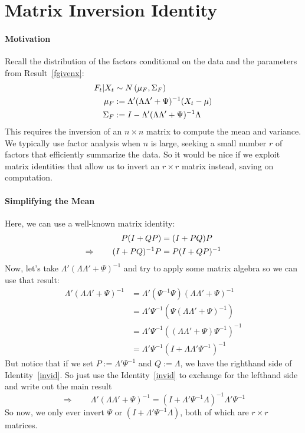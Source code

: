 \documentclass[12pt]{article}
\theoremstyle{plain}
\theoremstyle{definition}
\theoremstyle{remark}
\begin{document}
\section{Matrix Inversion Identity}
\label{sec:inv}

\paragraph{Motivation} Recall the distribution of the factors
conditional on the data and the parameters from Result~\ref{fgivenx}:
\begin{align}
  F_t|X_t &\sim N\left(\mu_F, \Sigma_F\right) \notag\\
  \mu_F &:= \Lambda'(\Lambda\Lambda'+\Psi)^{-1}(X_t-\mu) \notag\\
  \Sigma_F &:= I- \Lambda'(\Lambda\Lambda'+\Psi)^{-1}\Lambda \notag
\end{align}
This requires the inversion of an $n\times n$ matrix to compute the mean
and variance. We typically use factor analysis when $n$ is large,
seeking a small number $r$ of factors that efficiently summarize the
data. So it would be nice if we exploit matrix identities that allow us
to invert an $r\times r$ matrix instead, saving on computation.

\paragraph{Simplifying the Mean}
Here, we can use a well-known matrix identity:
\begin{align}
  P(I+QP) &= (I+PQ)P \notag\\
  \Rightarrow \qquad
  (I+PQ)^{-1}P &= P (I+QP)^{-1} \label{invid}
\end{align}
Now, let's take $\Lambda'(\Lambda \Lambda' +\Psi)^{-1}$ and try to apply
some matrix algebra so we can use that result:
\begin{align*}
    \Lambda'(\Lambda \Lambda' +\Psi)^{-1} &=
    \Lambda' \left(\Psi^{-1}\Psi\right)(\Lambda \Lambda' +\Psi)^{-1}\\
    &= \Lambda' \Psi^{-1}\left(\Psi(\Lambda \Lambda' +\Psi)^{-1}\right)\\
    &= \Lambda' \Psi^{-1}\left((\Lambda \Lambda'
      +\Psi)\Psi^{-1}\right)^{-1}\\
    &= \Lambda' \Psi^{-1}\left(I+\Lambda \Lambda'\Psi^{-1}\right)^{-1}
\end{align*}
But notice that if we set $P:=\Lambda'\Psi^{-1}$ and $Q:=\Lambda$, we
have the righthand side of Identity~\ref{invid}. So just use the
Identity~\ref{invid} to exchange for the lefthand side and write out the
main result
\begin{equation}
  \Rightarrow\qquad
  \Lambda'(\Lambda \Lambda' +\Psi)^{-1} =
  (I+\Lambda'\Psi^{-1}\Lambda)^{-1} \Lambda'\Psi^{-1}
\end{equation}
So now, we only ever invert $\Psi$ or $(I+\Lambda'\Psi^{-1}\Lambda)$,
both of which are $r\times r$ matrices.
\end{document}

